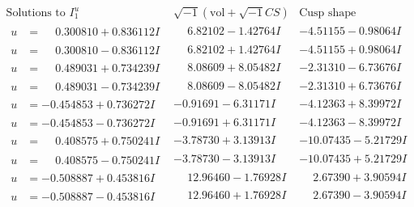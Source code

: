 \documentclass[1p]{elsarticle_modified}
\theoremstyle{definition}
\newcommand{\I}{\sqrt{-1}}
\begin{document}
$$\begin{array}{c|c|c}  
\text{Solutions to }I^u_{1}& \I (\text{vol} + \sqrt{-1}CS) & \text{Cusp shape}\\
 \hline 
\begin{aligned}
u &= \phantom{-}0.300810 + 0.836112 I\end{aligned}
 & \phantom{-}6.82102 - 1.42764 I & -4.51155 - 0.98064 I \\ \hline\begin{aligned}
u &= \phantom{-}0.300810 - 0.836112 I\end{aligned}
 & \phantom{-}6.82102 + 1.42764 I & -4.51155 + 0.98064 I \\ \hline\begin{aligned}
u &= \phantom{-}0.489031 + 0.734239 I\end{aligned}
 & \phantom{-}8.08609 + 8.05482 I & -2.31310 - 6.73676 I \\ \hline\begin{aligned}
u &= \phantom{-}0.489031 - 0.734239 I\end{aligned}
 & \phantom{-}8.08609 - 8.05482 I & -2.31310 + 6.73676 I \\ \hline\begin{aligned}
u &= -0.454853 + 0.736272 I\end{aligned}
 & -0.91691 - 6.31171 I & -4.12363 + 8.39972 I \\ \hline\begin{aligned}
u &= -0.454853 - 0.736272 I\end{aligned}
 & -0.91691 + 6.31171 I & -4.12363 - 8.39972 I \\ \hline\begin{aligned}
u &= \phantom{-}0.408575 + 0.750241 I\end{aligned}
 & -3.78730 + 3.13913 I & -10.07435 - 5.21729 I \\ \hline\begin{aligned}
u &= \phantom{-}0.408575 - 0.750241 I\end{aligned}
 & -3.78730 - 3.13913 I & -10.07435 + 5.21729 I \\ \hline\begin{aligned}
u &= -0.508887 + 0.453816 I\end{aligned}
 & \phantom{-}12.96460 - 1.76928 I & \phantom{-}2.67390 + 3.90594 I \\ \hline\begin{aligned}
u &= -0.508887 - 0.453816 I\end{aligned}
 & \phantom{-}12.96460 + 1.76928 I & \phantom{-}2.67390 - 3.90594 I \\ \hline\begin{aligned}

\end{aligned}
\end{array}$$
\end{document}

